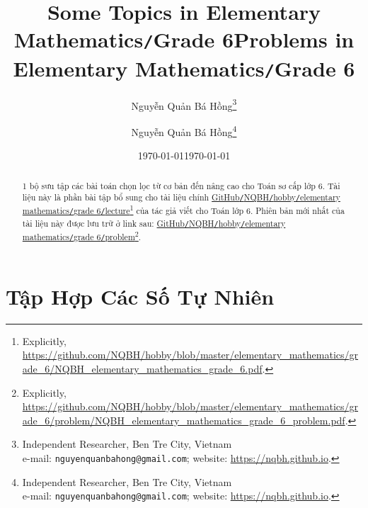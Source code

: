 \documentclass{article}
\title{Some Topics in Elementary Mathematics\texttt{/}Grade 6}
\author{Nguyễn Quản Bá Hồng\footnote{Independent Researcher, Ben Tre City, Vietnam\\e-mail: \texttt{nguyenquanbahong@gmail.com}; website: \url{https://nqbh.github.io}.}}
\date{\today}
\title{Problems in Elementary Mathematics\texttt{/}Grade 6}
\author{Nguyễn Quản Bá Hồng\footnote{Independent Researcher, Ben Tre City, Vietnam\\e-mail: \texttt{nguyenquanbahong@gmail.com}; website: \url{https://nqbh.github.io}.}}
\date{\today}
\numberwithin{equation}{section}
\begin{document}
\maketitle
\begin{abstract}
	1 bộ sưu tập các bài toán chọn lọc từ cơ bản đến nâng cao cho Toán sơ cấp lớp 6. Tài liệu này là phần bài tập bổ sung cho tài liệu chính \href{https://github.com/NQBH/hobby/blob/master/elementary_mathematics/grade_6/NQBH_elementary_mathematics_grade_6.pdf}{GitHub\texttt{/}NQBH\texttt{/}hobby\texttt{/}elementary mathematics\texttt{/}grade 6\texttt{/}lecture}\footnote{Explicitly, \url{https://github.com/NQBH/hobby/blob/master/elementary_mathematics/grade_6/NQBH_elementary_mathematics_grade_6.pdf}.} của tác giả viết cho Toán lớp 6. Phiên bản mới nhất của tài liệu này được lưu trữ ở link sau: \href{https://github.com/NQBH/hobby/blob/master/elementary_mathematics/grade_6/problem/NQBH_elementary_mathematics_grade_6_problem.pdf}{GitHub\texttt{/}NQBH\texttt{/}hobby\texttt{/}elementary mathematics\texttt{/}grade 6\texttt{/}problem}\footnote{Explicitly, \url{https://github.com/NQBH/hobby/blob/master/elementary_mathematics/grade_6/problem/NQBH_elementary_mathematics_grade_6_problem.pdf}.}.
\end{abstract}

\tableofcontents
\newpage


\section{Tập Hợp Các Số Tự Nhiên}
\end{document}
